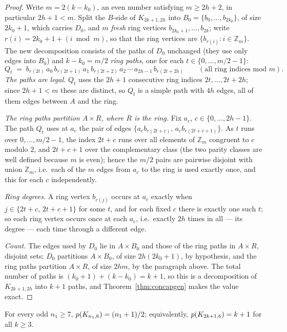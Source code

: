 \begin{proof}
Write $m=2(k-k_0)$, an even number satisfying $m\ge2h+2$, in particular
$2h+1<m$. Split the $B$-side of $K_{2k+1,2h}$ into
$B_0=\{b_0,\dots,b_{2k_0}\}$, of size $2k_0+1$, which carries $D_0$, and
$m$ \emph{fresh} ring vertices $b_{2k_0+1},\dots,b_{2k}$; write
$r(i)=2k_0+1+(i\bmod m)$, so that the ring vertices are
$\{b_{r(i)} : i\in\mathbb{Z}_m\}$. The new decomposition consists of the
paths of $D_0$ unchanged (they use only edges into $B_0$) and
$k-k_0=m/2$ \emph{ring paths}, one for each $t\in\{0,\dots,m/2-1\}$:
\[
Q_t\;=\;b_{r(2t)}\,a_0\,b_{r(2t+1)}\,a_1\,b_{r(2t+2)}\,a_2\,\cdots\,a_{2h-1}\,b_{r(2t+2h)}
\qquad(\text{all ring indices mod } m).
\]
\emph{The paths are legal.} $Q_t$ uses the $2h+1$ consecutive ring indices
$2t,\dots,2t+2h$; since $2h+1<m$ these are distinct, so $Q_t$ is a simple
path with $4h$ edges, all of them edges between $A$ and the ring.

\emph{The ring paths partition $A\times R$, where $R$ is the ring.} Fix
$a_c$, $c\in\{0,\dots,2h-1\}$. The path $Q_t$ uses at $a_c$ the pair of
edges $\{a_cb_{r(2t+c)},\,a_cb_{r(2t+c+1)}\}$. As $t$ runs over
$0,\dots,m/2-1$, the index $2t+c$ runs over all elements of
$\mathbb{Z}_m$ congruent to $c$ modulo $2$, and $2t+c+1$ over the
complementary class (the two parity classes are well defined because $m$
is even); hence the $m/2$ pairs are pairwise disjoint with union
$\mathbb{Z}_m$, i.e.\ each of the $m$ edges from $a_c$ to the ring is used
exactly once, and this for each $c$ independently.

\emph{Ring degrees.} A ring vertex $b_{r(j)}$ occurs at $a_c$ exactly when
$j\in\{2t+c,\,2t+c+1\}$ for some $t$, and for each fixed $c$ there is
exactly one such $t$; so each ring vertex occurs once at each $a_c$, i.e.\
exactly $2h$ times in all --- its degree --- each time through a different
edge.

\emph{Count.} The edges used by $D_0$ lie in $A\times B_0$ and those of
the ring paths in $A\times R$, disjoint sets; $D_0$ partitions
$A\times B_0$, of size $2h(2k_0+1)$, by hypothesis, and the ring paths
partition $A\times R$, of size $2hm$, by the paragraph above. The total
number of paths is $(k_0+1)+(k-k_0)=k+1$, so this is a decomposition of
$K_{2k+1,2h}$ into $k+1$ paths, and Theorem~\ref{thm:concapgen} makes the
value exact.
\end{proof}

\begin{corollary}[the $n_2=6$ column]\label{cor:concol6}
For every odd $n_1\ge7$, $p(K_{n_1,6})=(n_1+1)/2$; equivalently,
$p(K_{2k+1,6})=k+1$ for all $k\ge3$.
\end{corollary}

